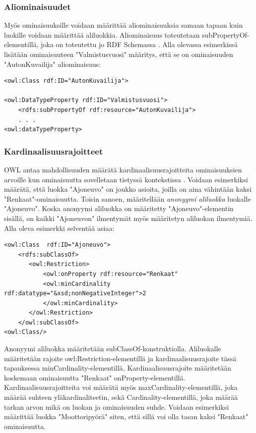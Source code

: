 \documentclass[finnish]{tktltiki2}
\theoremstyle{definition}
\theoremstyle{remark}
\begin{document}
\subsubsection{Aliominaisuudet}
Myös ominaisuuksille voidaan määrittää aliominaisuuksia samaan tapaan kuin luokille voidaan määrittää aliluokkia. Aliominaisuus toteutetaan subPropertyOf-elementillä, joka on toteutettu jo RDF Schemassa \cite{SWM04}. Alla olevassa esimerkissä lisätään ominaisuuteen "Valmistusvuosi" määritys, että se on ominaisuuden "AutonKuvailija" aliominaisuus:
\begin{verbatim}
<owl:Class rdf:ID="AutonKuvailija">

<owl:DataTypeProperty rdf:ID="Valmistusvuosi">
    <rdfs:subPropertyOf rdf:resource="AutonKuvailija">
    . . .
<owl:dataTypeProperty>
\end{verbatim}

\subsubsection{Kardinaalisuusrajoitteet}
OWL antaa mahdollisuuden määrätä kardinaalisuusrajoitteita ominaisuuksien arvoille kun ominaisuutta sovelletaan tietyssä kontekstissa \cite{SWM04}. Voidaan esimerkiksi määrätä, että luokka "Ajoneuvo" on joukko asioita, joilla on aina vähintään kaksi "Renkaat"-ominaisuutta. Toisin sanoen, määritellään \textit{anonyymi aliluokka} \cite{SWM04} luokalle "Ajoneuvo". Koska anonyymi aliluokka on määritetty "Ajoneuvo"-elementin sisällä, on kaikki "Ajoneuvon"  ilmentymät myös määritetyn aliluokan ilmentymiä. Alla oleva esimerkki selventää asiaa:
\begin{verbatim}
<owl:Class  rdf:ID="Ajoneuvo">
    <rdfs:subClassOf>
       <owl:Restriction>
           <owl:onProperty rdf:resource="Renkaat"
           <owl:minCardinality rdf:datatype="&xsd;nonNegativeInteger">2
           </owl:minCardinality>
       </owl:Restriction>
    </owl:subClassOf>
<owl:Class/>
\end{verbatim}
Anonyymi aliluokka määritetään subClassOf-konstruktiolla. Aliluokalle määritetään rajoite owl:Restriction-elementillä ja kardinaalisuusrajoite tässä tapauksessa  minCardinality-elementillä. Kardinaalisuusrajoite määritetään koskemaan ominaisuutta "Renkaat" onProperty-elementillä. Kardinaalisuusrajoitteita voi määrätä myös maxCardinality-elementillä, joka määrää suhteen yläkardinaliteetin, sekä Cardinality-elementillä, joka määrää tarkan arvon mikä on luokan ja ominaisuuden suhde. Voidaan esimerkiksi määrittää luokka "Moottoripyörä" siten, että sillä voi olla tasan kaksi "Renkaat" ominaisuutta.   
\end{document}
